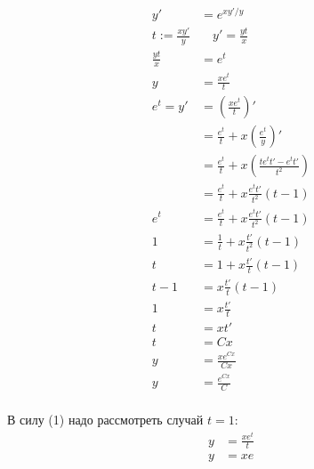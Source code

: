 \begin{align*}
    y'                 & = e^{xy'/y}                                                 \\
    t := \frac{xy'}{y} & \quad y' = \frac{yt}{x}                                     \\
    \frac{yt}{x}       & = e^t                                                       \\
    y                  & = \frac{xe^t}{t}                                            \\
    e^t = y'           & = \left(\frac{xe^t}{t}\right)'                              \\
                       & = \frac{e^t}{t} + x\left(\frac{e^t}{y}\right)'              \\
                       & = \frac{e^t}{t} + x\left(\frac{te^tt' - e^t t'}{t^2}\right) \\
                       & = \frac{e^t}{t} + x\frac{e^tt'}{t^2}\left(t-1\right)        \\
    e^t                & = \frac{e^t}{t} + x\frac{e^tt'}{t^2}\left(t-1\right)        \\
    1                  & = \frac{1}{t} + x\frac{t'}{t^2}\left(t-1\right)             \\
    t                  & = 1 + x\frac{t'}{t}\left(t-1\right)                         \\
    t - 1              & = x\frac{t'}{t}\left(t-1\right)                     \tag{1} \\
    1                  & = x\frac{t'}{t}                                             \\
    t                  & = xt'                                                       \\
    t                  & = Cx                                                        \\
    y                  & = \frac{xe^{Cx}}{Cx}                                        \\
    y                  & = \frac{e^{Cx}}{C}                                          \\
\end{align*}

В силу (1) надо рассмотреть случай $t=1$:
\begin{align*}
    y & = \frac{xe^t}{t} \\
    y & = xe             \\
\end{align*}

